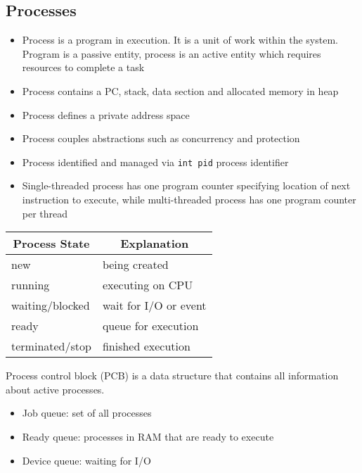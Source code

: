 \documentclass[a4paper]{article}
\begin{document}
\subsection{Processes}
\begin{itemize}
	\item Process is a program in execution. It is a unit of work within the system. Program is a passive entity, process is an active entity which requires resources to complete a task
	\item Process contains a PC, stack, data section and allocated memory in heap
	\item Process defines a private address space
	\item Process couples abstractions such as concurrency and protection
	\item Process identified and managed via \texttt{int pid} process identifier
	\item Single-threaded process has one program counter specifying location of next instruction to execute, while multi-threaded process has one program counter per thread
\end{itemize}
\begin{table}[H]
	\centering
\begin{tabular}{|l|l|}
	\hline
	\multicolumn{1}{|c|}{\textbf{Process State}} & \multicolumn{1}{c|}{\textbf{Explanation}} \\ \hline
	new                                          & being created                             \\ \hline
	running                                      & executing on CPU                          \\ \hline
	waiting/blocked                              & wait for I/O or event                     \\ \hline
	ready                                        & queue for execution                       \\ \hline
	terminated/stop                              & finished execution                        \\ \hline
\end{tabular}
\end{table}
Process control block (PCB) is a data structure that contains all information about active processes.
\begin{itemize}
	\item Job queue: set of all processes
	\item Ready queue: processes in RAM that are ready to execute
	\item Device queue: waiting for I/O
\end{itemize}
\end{document}

